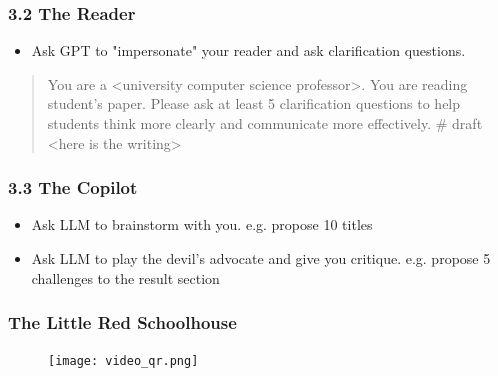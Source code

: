 \documentclass{beamer}
\begin{document}
\begin{frame}
\frametitle{3.2 The Reader}
\begin{itemize}
    \item Ask GPT to "impersonate" your reader and ask clarification questions.
\end{itemize}
\begin{quote}
    You are a <university computer science professor>. You are reading student's paper. \newline
    Please ask at least 5 clarification questions to help students think more clearly and communicate more effectively.
    \newline
    \# draft \newline
    <here is the writing>
\end{quote}
\end{frame}   


\begin{frame}
  \frametitle{3.3 The Copilot}
  \begin{itemize}
      \item Ask LLM to brainstorm with you. e.g. propose 10 titles
      \item Ask LLM to play the devil's advocate and give you critique. e.g. propose 5 challenges to the result section
  \end{itemize}
\end{frame}   

\begin{frame}
  \frametitle{The Little Red Schoolhouse}
  \begin{figure}
    \centering
    \texttt{[image: video\_qr.png]}
\end{figure}
\end{frame}
\end{document}
